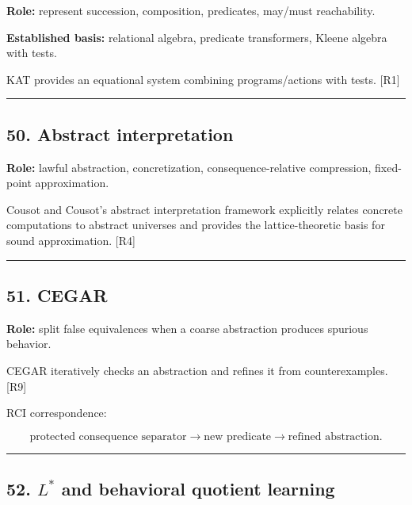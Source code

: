 \documentclass[
]{article}
\begin{document}
\textbf{Role:} represent succession, composition, predicates, may/must
reachability.

\textbf{Established basis:} relational algebra, predicate transformers,
Kleene algebra with tests.

KAT provides an equational system combining programs/actions with tests.
{[}R1{]}

\begin{center}\rule{0.5\linewidth}{0.5pt}\end{center}

\subsection{50. Abstract interpretation}\label{abstract-interpretation}

\textbf{Role:} lawful abstraction, concretization, consequence-relative
compression, fixed-point approximation.

Cousot and Cousot's abstract interpretation framework explicitly relates
concrete computations to abstract universes and provides the
lattice-theoretic basis for sound approximation. {[}R4{]}

\begin{center}\rule{0.5\linewidth}{0.5pt}\end{center}

\subsection{51. CEGAR}\label{cegar}

\textbf{Role:} split false equivalences when a coarse abstraction
produces spurious behavior.

CEGAR iteratively checks an abstraction and refines it from
counterexamples. {[}R9{]}

RCI correspondence:

\[
\boxed{
\text{protected consequence separator}
\to
\text{new predicate}
\to
\text{refined abstraction}.
}
\]

\begin{center}\rule{0.5\linewidth}{0.5pt}\end{center}

\subsection{\texorpdfstring{52. \(L^*\) and behavioral quotient
learning}{52. L\^{}* and behavioral quotient learning}}\label{l-and-behavioral-quotient-learning}
\end{document}
